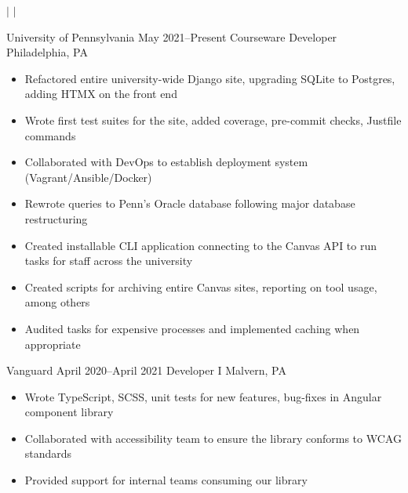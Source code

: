 \documentclass{article}
\begin{document}
\begin{center}
  \name{\fullName}

  \vspace{0.2em}

  \link{\email}
    $|$
    \small{\phone}
    $|$
    \link{\github}
\end{center}


\begin{itemize}[leftmargin=0em, label={}]
    \experience
        {University of Pennsylvania}
        {May 2021--Present}
        {Courseware Developer}
        {Philadelphia, PA}
        \begin{itemize}[label=*]
          \item \small Refactored entire university-wide Django site, upgrading
            SQLite to Postgres, adding HTMX on the front end
          \item \small Wrote first test suites for the site, added coverage,
            pre-commit checks, Justfile commands
          \item \small Collaborated with DevOps to establish deployment system
            (Vagrant/Ansible/Docker)
          \item \small Rewrote queries to Penn’s Oracle database following major
            database restructuring
          \item \small Created installable CLI application connecting to the
            Canvas API to run tasks for staff across the university
          \item \small Created scripts for archiving entire Canvas sites,
            reporting on tool usage, among others
          \item \small Audited tasks for expensive processes and implemented
            caching when appropriate
        \end{itemize}
    \experience
        {Vanguard}
        {April 2020--April 2021}
        {Developer I}
        {Malvern, PA}
        \begin{itemize}[label=*]
          \item \small Wrote TypeScript, SCSS, unit tests for new features,
            bug-fixes in Angular component library
          \item \small Collaborated with accessibility team to ensure the
            library conforms to WCAG standards
          \item \small Provided support for internal teams consuming our library

\end{itemize}
\end{itemize}
\end{document}
